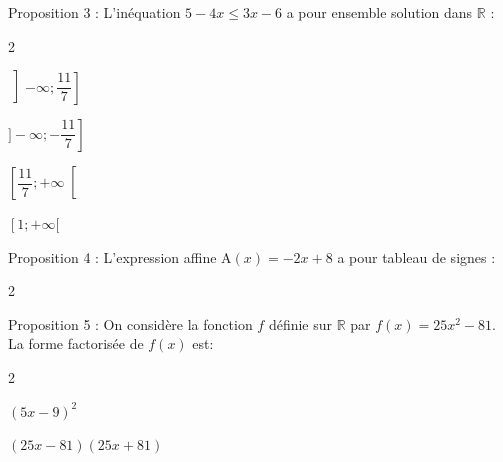 \documentclass[12pt,a4paper]{article}  %
\begin{document}
\begin{enumMet}
	\item Proposition 3 : L'inéquation $5-4 x \leqslant 3 x-6$ a pour ensemble solution dans $\mathbb{R}$ :
	\begin{multicols}{2}
		\begin{enumMet}
		\item $\left]-\infty ; \dfrac{11}{7}\right]$ 
		\item $\left.]-\infty ;-\dfrac{11}{7}\right]$
		\item $\left[\dfrac{11}{7} ;+\infty\right[$
		\item $\left[1 ;+\infty[\right.$
	\end{enumMet}
	\end{multicols}
	\item Proposition 4 : L'expression affine $\mathrm{A}(x)=-2 x+8$ a pour tableau de signes :
	\begin{multicols}{2}
		\begin{enumMet}
			\item {}	
			\item {}	
			\item {}	
			\item {}	
		\end{enumMet}
	\end{multicols}
	\item Proposition 5 : On considère la fonction $f$ définie sur $\mathbb{R}$ par $f(x)=25 x^{2}-81$. La forme factorisée de $f(x)$ est:
	\begin{multicols}{2}
		\begin{enumMet}
			\item 	$(5 x-9)^{2}$
			\item $(25 x-81)(25 x+81)$

\end{enumMet}
\end{multicols}
\end{enumMet}
\end{document}
